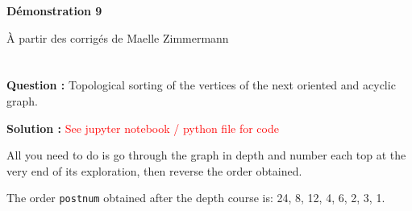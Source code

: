 \documentclass[11pt]{article} %
\newenvironment{question}[1][\unskip]{%
	\par
	\noindent
	\textbf{Question #1:}
	\noindent}
{\medskip}
\newenvironment{solution}[1][\unskip]{%
	\par
	\noindent
	\textbf{Solution #1:}
	\noindent}
{\medskip}
\begin{document}

	\noindent \hrulefill
	\centerline{\bfseries Démonstration 9}
	\centerline{À partir des corrigés de Maelle Zimmermann}	
	\noindent \hrulefill
	
	\vspace{1cm}
	
		
	\section{}
	\begin{question}
        Topological sorting of the vertices of the next oriented and acyclic graph.		%
	\end{question}
	\begin{solution}
		\textcolor{red}{See jupyter notebook / python file for code}
		
		
		All you need to do is go through the graph in depth and number each
		top at the very end of its exploration, then reverse the order obtained.

		The order \verb|postnum| obtained after the depth course is: 24, 8, 12, 4, 6, 2, 3, 1.
	\end{solution}
	
	\newpage
\end{document}
